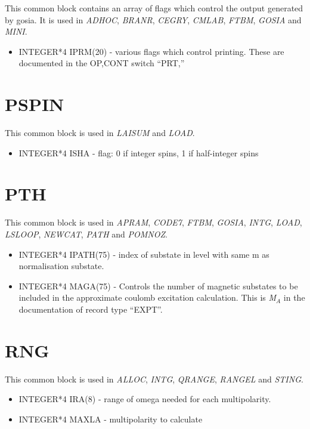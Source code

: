 This common block contains an array of flags which control the output
generated by gosia. It is used in \emph{ADHOC}, \emph{BRANR}, \emph{CEGRY},
\emph{CMLAB}, \emph{FTBM}, \emph{GOSIA} and \emph{MINI}.

\begin{itemize}
\item INTEGER*4 IPRM(20) - various flags which control printing. These are
documented in the OP,CONT switch ``PRT,''
\end{itemize}

\section{PSPIN}

This common block is used in \emph{LAISUM} and \emph{LOAD}.

\begin{itemize}
\item INTEGER*4 ISHA - flag: 0 if integer spins, 1 if half-integer spins
\end{itemize}

\section{PTH}

This common block is used in \emph{APRAM}, \emph{CODE7}, \emph{FTBM}, \emph{
GOSIA}, \emph{INTG}, \emph{LOAD}, \emph{LSLOOP}, \emph{NEWCAT}, \emph{PATH} and
\emph{POMNOZ}.

\begin{itemize}
\item INTEGER*4 IPATH(75) - index of substate in level with same m as
normalisation substate.
\item INTEGER*4 MAGA(75) - Controls the number of magnetic substates to be
included in the approximate coulomb excitation calculation. This is \emph{
M$_A$} in the documentation of record type ``EXPT''.
\end{itemize}

\section{RNG}

This common block is used in \emph{ALLOC}, \emph{INTG}, \emph{QRANGE}, \emph{
RANGEL} and \emph{STING}.

\begin{itemize}
\item INTEGER*4 IRA(8) - range of omega needed for each multipolarity.
\item INTEGER*4 MAXLA - multipolarity to calculate
\end{itemize}

